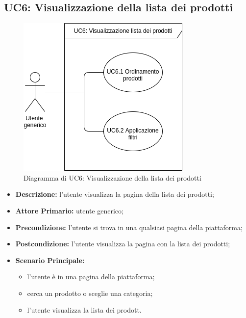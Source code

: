         \subsection{UC6: Visualizzazione della lista dei prodotti}
        \label{sec:UC6}
        \begin{figure}[!ht]
            \caption{Diagramma di UC6: Visualizzazione della lista dei prodotti}
            \vspace{10px}
            \includegraphics[scale=0.5]{../../../Images/AnalisiRequisiti/UC6.png}
            \centering
        \end{figure}
        \begin{itemize}
            \item \textbf{Descrizione:} l'utente visualizza la pagina della lista dei prodotti;
            \item \textbf{Attore Primario:} utente generico;
            \item \textbf{Precondizione:} l'utente si trova in una qualsiasi pagina della piattaforma;
            \item \textbf{Postcondizione:} l'utente visualizza la pagina con la lista dei prodotti;
            \item \textbf{Scenario Principale:}
            \begin{itemize}
                \item l'utente è in una pagina della piattaforma;
                \item cerca un prodotto o sceglie una categoria;
                \item l'utente visualizza la lista dei prodott.
            \end{itemize}
        \end{itemize}
